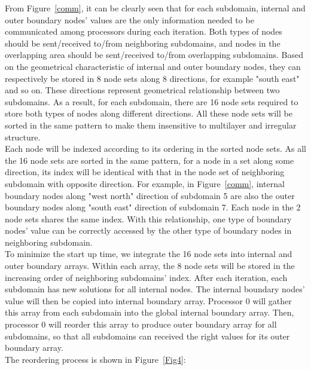 \documentclass{sig-alternate}
\begin{document}
	From Figure~\ref{comm}, it can be clearly seen that for each subdomain, internal and outer boundary nodes' values 
	are the only information needed to be communicated among processors during each iteration. Both types of nodes should be 
	sent/received to/from neighboring subdomains, and nodes in the overlapping area should be sent/received to/from  
	overlapping subdomains. Based on the geometrical characteristic of internal and outer boundary nodes, they can respectively 
	be stored in 8 node sets along 8 directions, for example "south east" and so on. These directions represent geometrical 
	relationship between two subdomains. As a result, for each subdomain, there are 16 node sets required to store both types of 
	nodes along different directions. All these node sets will be sorted in the same pattern to make them insensitive to 
	multilayer and irregular structure.\\ 

	Each node will be
	indexed according to its ordering in the sorted node sets. As all the 16 node sets are sorted in the same pattern, for a node in
	a set along some direction, its index will be identical with that in the node set of neighboring subdomain with opposite
	direction. For example, in Figure~\ref{comm}, internal boundary nodes along "west north" 
	direction of subdomain 5 are also the outer boundary nodes along "south east" direction of subdomain 7. Each node in the 
	2 node sets shares the same index. With this relationship, one type of boundary nodes' value can be 
	correctly accessed by the other type of boundary nodes in neighboring subdomain.\\

	To minimize the start up time, we integrate the 16 node sets into internal and outer boundary arrays. 
	Within each array, the 8 node sets will be stored in the increasing order of neighboring subdomains' index. 
	After each iteration, each subdomain has new solutions for all internal nodes. The internal 
	boundary nodes' value will then be copied into internal boundary array. Processor 0 will gather this array from each subdomain
	into the global internal boundary array. Then, processor 0 will reorder this array to produce outer boundary array 
	for all subdomains, so that all subdomains can received the right values for its outer boundary array.\\ 

	The reordering process is shown in Figure~\ref{Fig4}: \\
\end{document}
